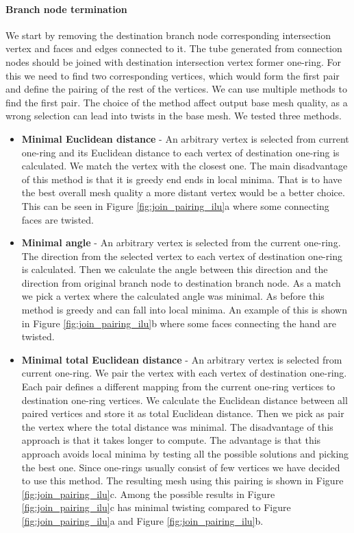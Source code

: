 \paragraph{Branch node termination}
We start by removing the destination branch node corresponding intersection vertex and faces and edges connected to it. The tube generated from connection nodes should be joined with destination intersection vertex former one-ring. For this we need to find two corresponding vertices, which would form the first pair and define the pairing of the rest of the vertices. We can use multiple methods to find the first pair. The choice of the method affect output base mesh quality, as a wrong selection can lead into twists in the base mesh. We tested three methods.
\begin{itemize}
	\itemsep-0.25em 
	\item \textbf{Minimal Euclidean distance} - An arbitrary vertex is selected from current one-ring and its Euclidean distance to each vertex of destination one-ring is calculated. We match the vertex with the closest one. The main disadvantage of this method is that it is greedy end ends in local minima. That is to have the best overall mesh quality a more distant vertex would be a better choice. This can be seen in Figure \ref{fig:join_pairing_ilu}a where some connecting faces are twisted.
	\item \textbf{Minimal angle} - An arbitrary vertex is selected from the current one-ring. The direction from the selected vertex to each vertex of destination one-ring is calculated. Then we calculate the angle between this direction and the direction from original branch node to destination branch node. As a match we pick a vertex where the calculated angle was minimal. As before this method is greedy and can fall into local minima. An example of this is shown in Figure \ref{fig:join_pairing_ilu}b where some faces connecting the hand are twisted.
	\item \textbf{Minimal total Euclidean distance} - An arbitrary vertex is selected from current one-ring. We pair the vertex with each vertex of destination one-ring. Each pair defines a different mapping from the current one-ring vertices to destination one-ring vertices. We calculate the Euclidean distance between all paired vertices and store it as total Euclidean distance. Then we pick as pair the vertex where the total distance was minimal. The disadvantage of this approach is that it takes longer to compute. The advantage is that this approach avoids local minima by testing all the possible solutions and picking the best one. Since one-rings usually consist of few vertices we have decided to use this method. The resulting mesh using this pairing is shown in Figure \ref{fig:join_pairing_ilu}c. Among the possible results in Figure \ref{fig:join_pairing_ilu}c has minimal twisting compared to Figure \ref{fig:join_pairing_ilu}a and Figure \ref{fig:join_pairing_ilu}b. 
\end{itemize}

